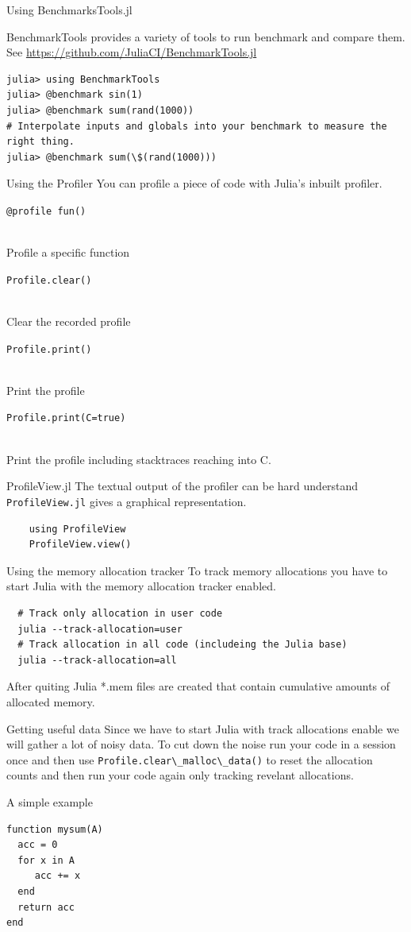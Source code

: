 \documentclass{beamer}
\newcommand*{\lstitem}[1]{
  \setbox0\hbox{\lstinline{#1}}  
  \item[\usebox0]  
  \hfill \\
}
\begin{document}
\begin{frame}[fragile]{Using BenchmarksTools.jl}
  \begin{block}{}
    BenchmarkTools provides a variety of tools to run benchmark and compare them. See \url{https://github.com/JuliaCI/BenchmarkTools.jl}
  \end{block}
  \begin{lstlisting}
julia> using BenchmarkTools
julia> @benchmark sin(1)
julia> @benchmark sum(rand(1000))
# Interpolate inputs and globals into your benchmark to measure the right thing.
julia> @benchmark sum(\$(rand(1000)))
  \end{lstlisting}
\end{frame}
\begin{frame}[fragile]{Using the Profiler}
  You can profile a piece of code with Julia's inbuilt profiler.
  \begin{description}
      \lstitem{@profile fun()} Profile a specific function
      \lstitem{Profile.clear()} Clear the recorded profile
      \lstitem{Profile.print()} Print the profile
      \lstitem{Profile.print(C=true)} Print the profile including stacktraces reaching into C.
  \end{description}
  \begin{block}{ProfileView.jl}
    The textual output of the profiler can be hard understand \lstinline{ProfileView.jl} gives a graphical representation.
    \begin{lstlisting}
    using ProfileView
    ProfileView.view()
    \end{lstlisting}
  \end{block}
\end{frame}
\begin{frame}[fragile]{Using the memory allocation tracker}
  To track memory allocations you have to start Julia with the memory allocation tracker enabled.
  \begin{lstlisting}
  # Track only allocation in user code
  julia --track-allocation=user
  # Track allocation in all code (includeing the Julia base)
  julia --track-allocation=all
  \end{lstlisting}
  After quiting Julia *.mem files are created that contain cumulative amounts of allocated memory.
  \begin{block}{Getting useful data}
    Since we have to start Julia with track allocations enable we will gather a lot of noisy data.
    To cut down the noise run your code in a session once and then use \lstinline{Profile.clear\_malloc\_data()}
    to reset the allocation counts and then run your code again only tracking revelant allocations.
  \end{block}
\end{frame}
\begin{frame}[fragile]{A simple example}
\begin{lstlisting}
function mysum(A)
  acc = 0
  for x in A
     acc += x
  end
  return acc
end
\end{lstlisting}
\end{frame}
\end{document}
